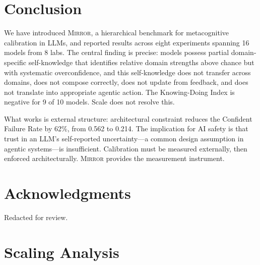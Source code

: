 \documentclass[10pt]{article}
\newcommand{\mirror}{\textsc{Mirror}}
\begin{document}
\vspace{-1mm}
\section{Conclusion}
\label{sec:conclusion}

We have introduced \mirror{}, a hierarchical benchmark for metacognitive
calibration in LLMs, and reported results across eight experiments spanning 16
models from 8 labs. The central finding is precise: models possess partial domain-specific
self-knowledge that identifies relative domain strengths above chance but with
systematic overconfidence, and this self-knowledge
does not transfer across domains, does not compose correctly, does not update from
feedback, and does not translate into appropriate agentic action. The Knowing-Doing
Index is negative for 9 of 10 models. Scale does not resolve this.

What works is external structure: architectural constraint reduces the Confident
Failure Rate by 62\%, from 0.562 to 0.214. The implication for AI safety is that
trust in an LLM's self-reported uncertainty---a common design assumption in agentic
systems---is insufficient. Calibration must be measured externally, then enforced
architecturally. \mirror{} provides the measurement instrument.

\section*{Acknowledgments}

Redacted for review.

\FloatBarrier



\newpage
\appendix

\section{Scaling Analysis}
\label{app:scaling}
\end{document}
